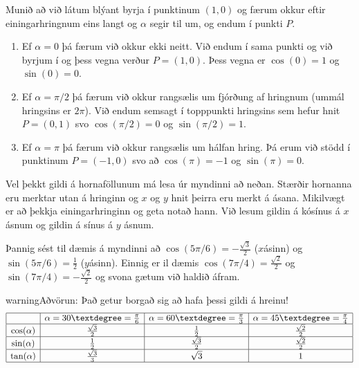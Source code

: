 \documentclass[a4paper,10pt,icelandic]{sphinxmanual}
\begin{document}
Munið að við látum blýant byrja í punktinum \((1,0)\) og færum okkur eftir einingarhringnum eins langt og \(\alpha\) segir til um, og endum í punkti \(P\).
\begin{enumerate}
%
\item {} 
Ef \(\alpha=0\) þá færum við okkur ekki neitt. Við endum í sama punkti og við byrjum í og þess vegna verður \(P=(1,0)\). Þess vegna er \(\cos(0)=1\) og \(\sin(0)=0\).

\item {} 
Ef \(\alpha=\pi/2\) þá færum við okkur rangsælis um fjórðung af hringnum (ummál hringsins er \(2\pi\)). Við endum semsagt í topppunkti hringsins sem hefur hnit \(P=(0,1)\) svo \(\cos(\pi/2)=0\) og \(\sin(\pi/2)=1\).

\item {} 
Ef \(\alpha=\pi\) þá færum við okkur rangsælis um hálfan hring. Þá erum við stödd í punktinum \(P=(-1,0)\) svo að \(\cos(\pi)=-1\) og \(\sin(\pi)=0\).

\end{enumerate}

Vel þekkt gildi á hornaföllunum má lesa úr myndinni að neðan.
Stærðir hornanna eru merktar utan á hringinn og \(x\) \sphinxhyphen{} og \(y\) \sphinxhyphen{} hnit þeirra eru merkt á ásana.
Mikilvægt er að þekkja einingarhringinn og geta notað hann.
Við lesum gildin á kósínus á \(x\) \sphinxhyphen{} ásnum og  gildin á sínus á \(y\) \sphinxhyphen{} ásnum.

Þannig sést til dæmis á myndinni að \(\cos(5\pi/6)=-\frac{\sqrt{3}}{2}\) (\(x\)\sphinxhyphen{}ásinn) og \(\sin(5\pi/6)=\frac12\) (\(y\)\sphinxhyphen{}ásinn). Einnig er il dæmis \(\cos(7\pi/4)=\frac{\sqrt{2}}{2}\) og \(\sin(7\pi/4)=-\frac{\sqrt{2}}{2}\) og svona gætum við haldið áfram.


\begin{sphinxadmonition}{warning}{Aðvörun:}
Það getur borgað sig að hafa þessi gildi á hreinu!
\begin{equation*}
\begin{split}\begin{array}{| c | c | c | c |}
        \hline
        & \alpha = 30°  = \frac{\pi}{6} & \alpha = 60° = \frac{\pi}{3} & \alpha = 45° = \frac{\pi}{4} \\
        \hline
        \cos(\alpha) & \frac{\sqrt{3}}{2} &     \frac{1}{2} & \frac{\sqrt{2}}{2} \\
        \hline
        \sin(\alpha) &  \frac{1}{2} & \frac{\sqrt{3}}{2} & \frac{\sqrt{2}}{2} \\
        \hline
        \tan(\alpha) & \frac{\sqrt{3}}{3} & \sqrt{3} & 1 \\
        \hline
\end{array}\end{split}
\end{equation*}\end{sphinxadmonition}
\end{document}
